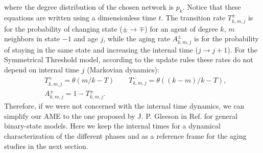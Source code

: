	 where the degree distribution of the chosen network is $p_k$. Notice that these equations are written using a dimensionless time $t$. The transition rate $T^{\pm}_{k,m,j}$ is for the probability of changing state ($\pm \to \mp$) for an agent of degree $k$, $m$ neighbors in state $-1$ and age $j$, while the aging rate $A^{\pm}_{k,m,j}$ is for the probability of staying in the same state and increasing the internal time ($j \to j + 1$). For the Symmetrical Threshold model, according to the update rules these rates do not depend on internal time $j$ (Markovian dynamics):
	\begin{eqnarray}
		&T^{+}_{k,m,j} = \theta(m/k - T) \quad \quad T^{-}_{k,m,j} = \theta((k-m)/k - T),\nonumber\\
		&A^{\pm}_{k,m,j} = 1 - T^{\pm}_{k,m,j}.
	\end{eqnarray}
	Therefore, if we were not concerned with the internal time dynamics, we can simplify our AME to the one proposed by J. P. Gleeson in Ref. \cite{gleeson-2013} for general binary-state models. Here we keep the internal times for a dynamical characterization of the different phases and as a reference frame for the aging studies in the next section. 
	
